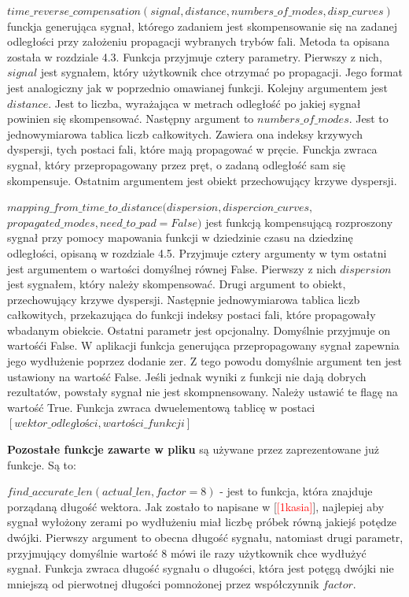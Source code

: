 $time\_reverse\_compensation(signal, distance, numbers\_of\_modes, disp\_curves)$ funckja generująca sygnał, którego zadaniem jest skompensowanie się na zadanej odległości przy założeniu propagacji wybranych trybów fali. Metoda ta opisana została w rozdziale 4.3. Funkcja przyjmuje cztery parametry. Pierwszy z nich, $signal$ jest sygnałem, który użytkownik chce otrzymać po propagacji. Jego format jest analogiczny jak w poprzednio omawianej funkcji. Kolejny argumentem jest $distance$. Jest to liczba, wyrażająca w metrach odległość po jakiej sygnał powinien się skompensować. Następny argument to $numbers\_of\_modes$. Jest to jednowymiarowa tablica liczb całkowitych. Zawiera ona indeksy krzywych dyspersji, tych postaci fali, które mają propagować w pręcie. Funckja zwraca sygnał, który przepropagowany przez pręt, o zadaną odległość sam się skompensuje. Ostatnim argumentem jest obiekt przechowujący krzywe dyspersji.

$mapping\_from\_time\_to\_distance(dispersion, dispercion\_curves,$
$ propagated\_modes, need\_to\_pad = False)$ jest funkcją kompensującą rozproszony sygnał przy pomocy mapowania funkcji w dziedzinie czasu na dziedzinę odległości, opisaną w rozdziale 4.5. Przyjmuje cztery argumenty w tym ostatni jest argumentem o wartości domyślnej równej False. Pierwszy z nich $dispersion$ jest sygnałem, który należy skompensować. Drugi argument to obiekt, przechowujący krzywe dyspersji. Następnie jednowymiarowa tablica liczb całkowitych, przekazująca do funkcji indeksy postaci fali, które propagowały  wbadanym obiekcie. Ostatni parametr jest opcjonalny. Domyślnie przyjmuje on wartośći False. W aplikacji funkcja generująca przepropagowany sygnał zapewnia jego wydłużenie poprzez dodanie zer. Z tego powodu domyślnie argument ten jest ustawiony na wartość False. Jeśli jednak wyniki z funkcji nie dają dobrych rezultatów, powstały sygnał nie jest skompnensowany. Należy ustawić te flagę na wartość True. Funkcja zwraca dwuelementową tablicę w postaci $[wektor\_odległości, wartości\_funkcji]$

\textbf{Pozostałe funkcje zawarte w pliku} są używane przez zaprezentowane już funkcje. Są to:

$find\_accurate\_len(actual\_len, factor=8)$ - jest to funkcja, która znajduje porządaną długość wektora. Jak zostało to napisane w [\textcolor{red}{[1kasia]}], najlepiej aby sygnał wyłożony zerami po wydłużeniu miał liczbę próbek równą jakiejś potędze dwójki. Pierwszy argument to obecna długość sygnału, natomiast drugi parametr, przyjmujący domyślnie wartość 8 mówi ile razy użytkownik chce wydłużyć sygnał. Funkcja zwraca długość sygnału o długości, która jest potęgą dwójki nie mniejszą od pierwotnej długości pomnożonej przez współczynnik $factor$.

